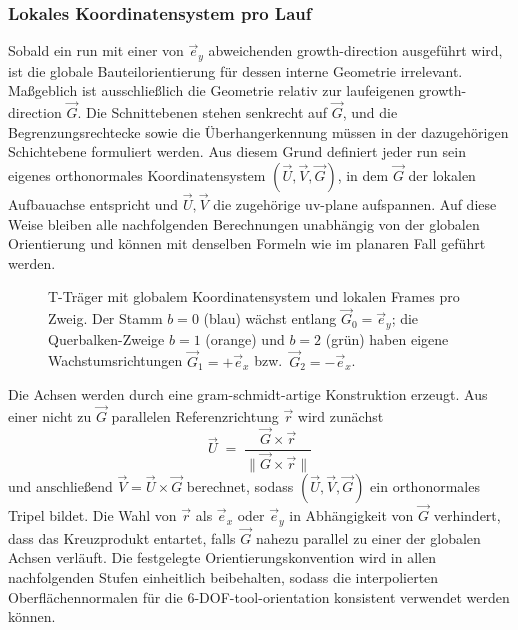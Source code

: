             \subsubsection{Lokales Koordinatensystem pro Lauf}\label{subsubsec:concept-base-uv-frame}
                Sobald ein \gls{run} mit einer von $\vec{e}_y$ abweichenden \gls{growth-direction} ausgeführt wird, ist die globale Bauteilorientierung für dessen interne Geometrie irrelevant.
                Maßgeblich ist ausschließlich die Geometrie relativ zur laufeigenen \gls{growth-direction} $\vec{G}$.
                Die Schnittebenen stehen senkrecht auf $\vec{G}$, und die Begrenzungsrechtecke sowie die Überhangerkennung müssen in der dazugehörigen Schichtebene formuliert werden.
                Aus diesem Grund definiert jeder \gls{run} sein eigenes orthonormales Koordinatensystem $(\vec{U}, \vec{V}, \vec{G})$, in dem $\vec{G}$ der lokalen Aufbauachse entspricht und $\vec{U}, \vec{V}$ die zugehörige \gls{uv-plane} aufspannen.
                Auf diese Weise bleiben alle nachfolgenden Berechnungen unabhängig von der globalen Orientierung und können mit denselben Formeln wie im planaren Fall geführt werden.

                \begin{figure}[ht]
                    \centering
                    
                    \caption[Lokale UVG-Frames der Zweig-Läufe am 3D-T-Träger]{
                        T-Träger mit globalem Koordinatensystem und lokalen Frames pro Zweig.
                        Der Stamm $b=0$ (blau) wächst entlang $\vec{G}_0 = \vec{e}_y$; die Querbalken-Zweige $b=1$ (orange) und $b=2$ (grün) haben eigene Wachstumsrichtungen $\vec{G}_1 = +\vec{e}_x$ bzw.\ $\vec{G}_2 = -\vec{e}_x$.
                    }
                    \label{fig:concept-base-uvg-frame}
                \end{figure}

            
                Die Achsen werden durch eine \gls{gram-schmidt}-artige Konstruktion erzeugt.
                Aus einer nicht zu $\vec{G}$ parallelen Referenzrichtung $\vec{r}$ wird zunächst
                \[
                    \vec{U} \;=\; \frac{\vec{G} \times \vec{r}}{\lVert \vec{G} \times \vec{r} \rVert}
                \]
                und anschließend $\vec{V} = \vec{U} \times \vec{G}$ berechnet, sodass $(\vec{U}, \vec{V}, \vec{G})$ ein orthonormales Tripel bildet.
                Die Wahl von $\vec{r}$ als $\vec{e}_x$ oder $\vec{e}_y$ in Abhängigkeit von $\vec{G}$ verhindert, dass das Kreuzprodukt entartet, falls $\vec{G}$ nahezu parallel zu einer der globalen Achsen verläuft.
                Die festgelegte Orientierungskonvention wird in allen nachfolgenden Stufen einheitlich beibehalten, sodass die interpolierten Oberflächennormalen für die 6-\ac{DOF}-\gls{tool-orientation} konsistent verwendet werden können.

